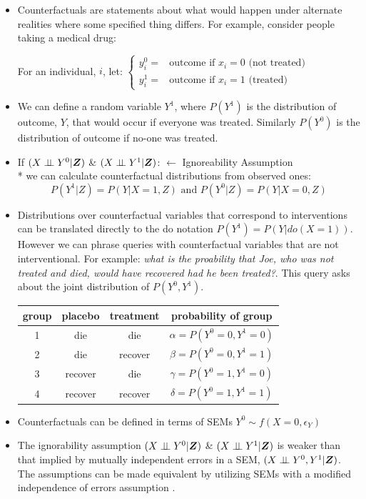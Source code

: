 \documentclass[20pt]{extreport}
\begin{document}
\begin{itemize}
\item Counterfactuals are statements about what would happen under alternate realities where some specified thing differs. For example, consider people taking a medical drug:

For an individual, $i$, let: $\begin{cases}y^{0}_{i} =& \text{outcome if $x_{i}=0$ (not treated)} \\ y^{1}_{i} =& \text{outcome if $x_{i}=1$ (treated)}
\end{cases}$ 

\item We can define a random variable $Y^{1}$, where $P(Y^{1})$ is the distribution of outcome, $Y$, that would occur if everyone was treated. Similarly $P(Y^{0})$ is the distribution of outcome if no-one was treated. 
\item If   $(X \perp\!\!\!\perp Y^{0}|\boldsymbol{Z})$ \&  $(X\perp\!\!\!\perp Y^{1}|\boldsymbol{Z})$:  $\longleftarrow$ Ignoreability Assumption \\*
we can calculate counterfactual distributions from observed ones:
\begin{equation*}
P(Y^{1}|Z) = P(Y|X=1,Z) \text{ and } P(Y^{0}|Z) = P(Y|X=0,Z)
\end{equation*}

\item Distributions over counterfactual variables that correspond to interventions can be translated directly to the do notation $P(Y^{1}) = P(Y|do(X=1))$. However we can phrase queries with counterfactual variables that are not interventional. For example: \textit{what is the proability that Joe, who was not treated and died, would have recovered had he been treated?}. This query asks about the joint distribution of $P(Y^{0},Y^{1})$. 

\begin{center}
\begin{tabular}{c|c|c|c}
group & placebo & treatment & probability of group\\
\hline
1 & die & die & $\alpha=P(Y^{0}=0,Y^{1}=0)$\\
2 & die & recover & $\beta=P(Y^{0}=0,Y^{1}=1)$\\
3 & recover & die & $\gamma=P(Y^{0}=1,Y^{1}=0)$\\
4 & recover & recover & $\delta=P(Y^{0}=1,Y^{1}=1)$\\
\end{tabular}
\end{center}

\item Counterfactuals can be defined in terms of SEMs $Y^0 \sim f(X=0,\epsilon_Y)$ 
\item The ignorability assumption $(X \perp\!\!\!\perp Y^{0}|\boldsymbol{Z})$ \&  $(X\perp\!\!\!\perp Y^{1}|\boldsymbol{Z})$ is weaker than that implied by mutually independent errors in a SEM, $(X \perp\!\!\!\perp Y^0,Y^1 | \boldsymbol{Z})$. The assumptions can be made equivalent by utilizing SEMs with a modified independence of errors assumption \cite{Richardson2013}. 

\end{itemize}
\end{document}
